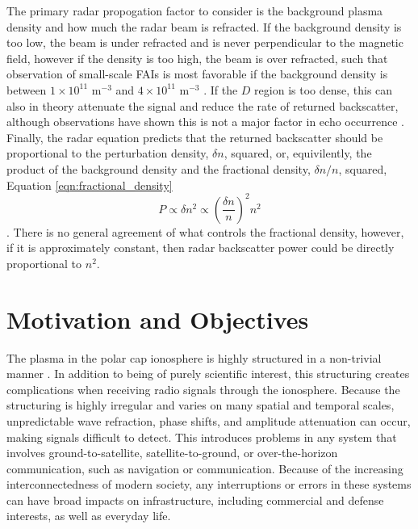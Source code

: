 The primary radar propogation factor to consider is the background plasma density and how much the radar beam is refracted.  If the background density is too low, the beam is under refracted and is never perpendicular to the magnetic field, however if the density is too high, the beam is over refracted, such that observation of small-scale FAIs is most favorable if the background density is between \(1\times 10^{11}\) m\(^{-3}\) and \(4\times 10^{11}\) m\(^{-3}\) \citep{Danskin2002,Makarevich2014b}.  If the \(D\) region is too dense, this can also in theory attenuate the signal and reduce the rate of returned backscatter, although observations have shown this is not a major factor in echo occurrence \citep{Danskin2002}.  Finally, the radar equation predicts that the returned backscatter should be proportional to the perturbation density, \(\delta n\), squared, or, equivilently, the product of the background density and the fractional density, \(\delta n/n\), squared, Equation \ref{eqn:fractional_density}
\begin{equation}
	\label{eqn:fractional_density}
	P \propto \delta n^2 \propto \left(\frac{\delta n}{n}\right)^2 n^2
\end{equation}.
There is no general agreement of what controls the fractional density, however, if it is approximately constant, then radar backscatter power could be directly proportional to \(n^2\).


\section{Motivation and Objectives}

The plasma in the polar cap ionosphere is highly structured in a non-trivial manner \citep{Tsunoda1988,Carlson2012}.  In addition to being of purely scientific interest, this structuring creates complications when receiving radio signals through the ionosphere.  Because the structuring is highly irregular and varies on many spatial and temporal scales, unpredictable wave refraction, phase shifts, and amplitude attenuation can occur, making signals difficult to detect.  This introduces problems in any system that involves ground-to-satellite, satellite-to-ground, or over-the-horizon communication, such as navigation or communication.  Because of the increasing interconnectedness of modern society, any interruptions or errors in these systems can have broad impacts on infrastructure, including commercial and defense interests, as well as everyday life.

